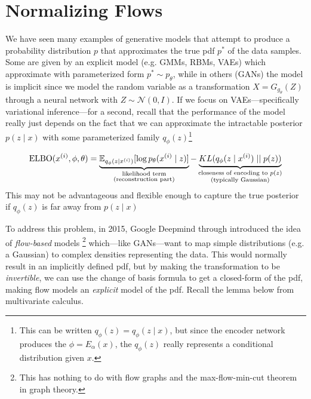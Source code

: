 \section{Normalizing Flows} 

  We have seen many examples of generative models that attempt to produce a probability distribution $p$ that approximates the true pdf $p^\ast$ of the data samples. Some are given by an explicit model (e.g. GMMs, RBMs, VAEs) which approximate with parameterized form $p^\ast \sim p_\theta$, while in others (GANs) the model is implicit since we model the random variable as a transformation $X = G_{g_\theta} (Z)$ through a neural network with $Z \sim \mathcal{N}(0, I)$. If we focus on VAEs---specifically variational inference---for a second, recall that the performance of the model really just depends on the fact that we can approximate the intractable posterior $p(z \mid x)$ with some parameterized family $q_\phi (z)$\footnote{This can be written $q_\phi (z) = q_\phi (z \mid x)$, but since the encoder network produces the $\phi = E_\alpha (x)$, the $q_\phi(z)$ really represents a conditional distribution given $x$.} 

  \begin{equation}
    \elbo(x^{(i)}, \phi, \theta) = \underbrace{\mathbb{E}_{q_\phi (z \mid x^{(i)})} [\log p_{\theta} (x^{(i)} \mid z)]}_{\substack{\text{likelihood term} \\ \text{(reconstruction part)}}}- \underbrace{KL(q_{\phi} (z \mid x^{(i)}) \mid\mid p(z))}_{\substack{\text{closeness of encoding to } p(z) \\ \text{(typically Gaussian)}}}
  \end{equation}
  This may not be advantageous and flexible enough to capture the true posterior if $q_\phi(z)$ is far away from $p(z \mid x)$

  To address this problem, in 2015, Google Deepmind through \cite{flow} introduced the idea of \textit{flow-based} models \footnote{This has nothing to do with flow graphs and the max-flow-min-cut theorem in graph theory.} which---like GANs---want to map simple distributions (e.g. a Gaussian) to complex densities representing the data. This would normally result in an implicitly defined pdf, but by making the transformation to be \textit{invertible}, we can use the change of basis formula to get a closed-form of the pdf, making flow models an \textit{explicit} model of the pdf. Recall the lemma below from multivariate calculus. 
  
